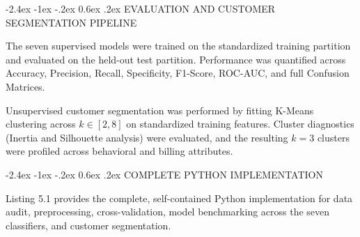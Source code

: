 \documentclass[12pt,oneside]{report}
\makeatletter
\renewcommand{\section}{\@startsection{section}{1}{\z@}%
  {-2.4ex \@plus -1ex \@minus -.2ex}%
  {0.6ex \@plus .2ex}%
  {\normalfont\large\bfseries}}
\makeatother
\begin{document}
\section{EVALUATION AND CUSTOMER SEGMENTATION PIPELINE}

The seven supervised models were trained on the standardized training partition and evaluated on the held-out test partition. Performance was quantified across Accuracy, Precision, Recall, Specificity, F1-Score, ROC-AUC, and full Confusion Matrices. 

Unsupervised customer segmentation was performed by fitting K-Means clustering across $k \in [2, 8]$ on standardized training features. Cluster diagnostics (Inertia and Silhouette analysis) were evaluated, and the resulting $k=3$ clusters were profiled across behavioral and billing attributes.

\newpage
\section{COMPLETE PYTHON IMPLEMENTATION}

Listing 5.1 provides the complete, self-contained Python implementation for data audit, preprocessing, cross-validation, model benchmarking across the seven classifiers, and customer segmentation.
\end{document}
